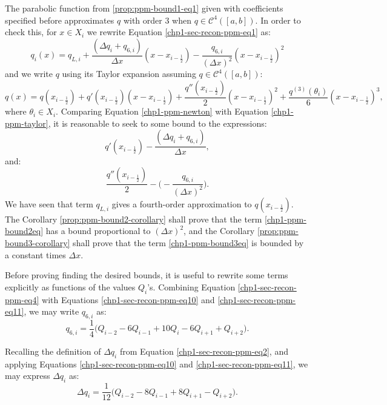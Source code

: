 The parabolic function from \eqref{prop:ppm-bound1-eq1} given with 
coefficients specified before approximates $q$ with order 3 when 
$q \in \mathcal{C}^4([a,b])$.
In order to check this, for $x \in X_i$ we rewrite Equation 
\eqref{chp1-sec-recon-ppm-eq1} as: 
\begin{equation}
	\label{chp1-ppm-newton}
	q_i(x) = q_{L,i} + \frac{(\Delta q_i + q_{6, i})}{\Delta x}(x-x_{i-\frac{1}{2}})
	-\frac{q_{6, i}}{(\Delta x)^2}(x-x_{i-\frac{1}{2}})^2
\end{equation}
and we write $q$ using its Taylor expansion assuming $q \in \mathcal{C}^4([a,b])$:
\begin{equation}
	\label{chp1-ppm-taylor}
	q(x) = q(x_{i-\frac{1}{2}}) + q'(x_{i-\frac{1}{2}})(x-x_{i-\frac{1}{2}})
	+ \frac{q''(x_{i-\frac{1}{2}})}{2}(x-x_{i-\frac{1}{2}})^2
	+ \frac{q^{(3)}(\theta_i)}{6}(x-x_{i-\frac{1}{2}})^3,
\end{equation}
where $\theta_i \in X_i$.
Comparing Equation \eqref{chp1-ppm-newton} with Equation \eqref{chp1-ppm-taylor},
it is reasonable to seek to some bound to the expressions:
\begin{equation}
	\label{chp1-ppm-bound2eq}
	q'(x_{i-\frac{1}{2}})-\frac{(\Delta q_i + q_{6, i})}{\Delta x},
\end{equation}
and:
\begin{equation} 
	\label{chp1-ppm-bound3eq}
	\frac{q''(x_{i-\frac{1}{2}})}{2} -\bigg(-\frac{q_{6, i}}{(\Delta x)^2}\bigg).
\end{equation}
We have seen that term $q_{L,i}$ gives a fourth-order approximation to $q(x_{i-\frac{1}{2}})$.
The Corollary \ref{prop:ppm-bound2-corollary} shall prove that 
the term \eqref{chp1-ppm-bound2eq} has a bound proportional to $(\Delta x)^2$, and
the Corollary \ref{prop:ppm-bound3-corollary} shall prove that the
term \eqref{chp1-ppm-bound3eq} is bounded by a constant times $\Delta x$.

Before proving finding the desired bounds, it is useful to rewrite some terms
explicitly as functions of the values $Q_i$'s.
Combining Equation \eqref{chp1-sec-recon-ppm-eq4} with Equations
\eqref{chp1-sec-recon-ppm-eq10} and \eqref{chp1-sec-recon-ppm-eq11}, 
we may write $q_{6,i}$ as:
\begin{equation}
	\label{def:q6i-2}
	q_{6,i} = \frac{1}{4} \bigg( Q_{i-2} - 6Q_{i-1} + 10Q_{i} -6Q_{i+1}  + Q_{i+2} \bigg).
\end{equation}

Recalling the definition of $\Delta q_i$ from Equation \eqref{chp1-sec-recon-ppm-eq2},
and applying Equations \eqref{chp1-sec-recon-ppm-eq10} and \eqref{chp1-sec-recon-ppm-eq11}, 
we may express $\Delta q_i$ as:
\begin{equation}
	\label{def:dqi-2}
	\Delta q_i = \frac{1}{12} \bigg(Q_{i-2} -8Q_{i-1} + 8Q_{i+1} -Q_{i+2} \bigg).
\end{equation}

